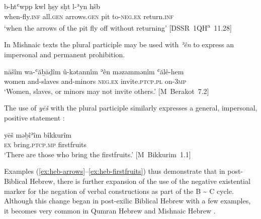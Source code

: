﻿\documentclass[output=paper]{langsci/langscibook}
\begin{document}
%
\begin{exe}\ex \label{ex:heb-arrows}
    \gll b-htʿwpp kwl ḥṣy sḥt l-ʾyn hšb  \\
  when-fly.\textsc{inf}     all.\textsc{gen}   arrows.\textsc{gen}   pit to-\textsc{neg.ex}   return.\textsc{inf} \\
    \glt `when the arrows of the pit fly off without returning'
    \mbox{[DSSR 1QH\textsuperscript{a} 11.28]}
    \end{exe}
%
In Mishnaic texts the plural participle may be used with \textit{ʾên} to express an impersonal and permanent prohibition. 
%
\begin{exe}\ex \label{ex:heb-women}
    \gll nāšîm wa-ʿăḇāḏîm û-kǝtannîm ʾên məzammənîm ʿălê-hem \\
  women   and-slaves   and-minors \textsc{neg.ex}   invite.\textsc{ptcp.pl}
  on-\textsc{3mp}\\
    \glt `Women, slaves, or minors may not invite others.'
    \mbox{[M Berakot 7.2]}
    \end{exe}
%
The use of \textit{yēš} with the plural participle similarly expresses a
general, impersonal, positive statement \parencite[134]{Perez1997}:
%
\begin{exe}\ex \label{ex:heb-firstfruits}
    \gll  yēš məḇîʾîm bîkkurîm\\
\textsc{ex}       bring.\textsc{ptcp.mp}     firstfruits \\
    \glt `There are those who bring the firstfruits.'
    \mbox{[M Bikkurim 1.1]}
    \end{exe}
%
Examples (\ref{ex:heb-arrows}--\ref{ex:heb-firstfruits}) thus demonstrate that in post-Biblical
Hebrew, there is further expansion of the use of the negative existential
marker for the negation of verbal constructions as part of the B
{\textasciitilde} C cycle. Although this change began in post-exilic
Biblical Hebrew with a few examples, it becomes very common in Qumran
Hebrew and Mishnaic Hebrew \parencite[36--39]{Hurvitz2014}.
\end{document}
